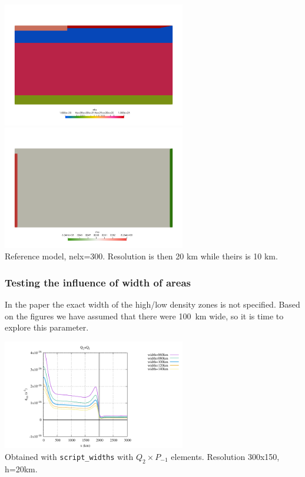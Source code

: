 \begin{center}
\includegraphics[width=8cm]{python_codes/fieldstone_143/results/resolutions/eta}
\includegraphics[width=8cm]{python_codes/fieldstone_143/results/resolutions/rho}\\
{\captionfont Reference model, nelx=300. Resolution is then 20 km while theirs is 10 km.}
\end{center}


\subsubsection*{Testing the influence of width of areas}

In the paper the exact width of the high/low density zones is not specified. 
Based on the figures we have assumed that there were 100~\si{\km} wide,
so it is time to explore this parameter.
\begin{center}
\includegraphics[width=8cm]{python_codes/fieldstone_143/results/widths_q2pm1/fig_widths}\\
{\captionfont Obtained with {\tt script\_widths} with $Q_2\times P_{-1}$ elements. Resolution 300x150, h=20km.}
\end{center}



